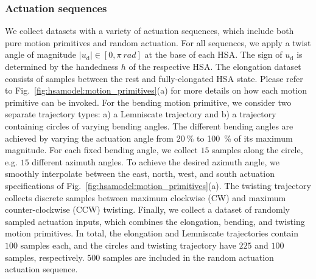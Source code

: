 \subsubsection{Actuation sequences}\label{ssub:hsamodel:hsa_rod_kinematics:actuation_sequences}
We collect datasets with a variety of actuation sequences, which include both pure motion primitives and random actuation. 
For all sequences, we apply a twist angle of magnitude  $|u_\mathrm{d}| \in [0, \pi \: \si{rad}]$ at the base of each \gls{HSA}. The sign of $u_\mathrm{d}$ is determined by the handedness $h$ of the respective \gls{HSA}.
The elongation dataset consists of samples between the rest and fully-elongated \gls{HSA} state. Please refer to Fig.~\ref{fig:hsamodel:motion_primitives}(a) for more details on how each motion primitive can be invoked.
For the bending motion primitive, we consider two separate trajectory types: a) a Lemniscate trajectory and b) a trajectory containing circles of varying bending angles. The different bending angles are achieved by varying the actuation angle from $\SI{20}{\percent}$ to \SI{100}{\percent} of its maximum magnitude. For each fixed bending angle, we collect $15$ samples along the circle, e.g. $15$ different azimuth angles.
To achieve the desired azimuth angle, we smoothly interpolate between the east, north, west, and south actuation specifications of Fig.~\ref{fig:hsamodel:motion_primitives}(a).
The twisting trajectory collects discrete samples between maximum clockwise (CW) and maximum counter-clockwise (CCW) twisting.
Finally, we collect a dataset of randomly sampled actuation inputs, which combines the elongation, bending, and twisting motion primitives. %
In total, the elongation and Lemniscate trajectories contain $100$ samples each, and the circles and twisting trajectory have $225$ and $100$ samples, respectively. $500$ samples are included in the random actuation actuation sequence.



